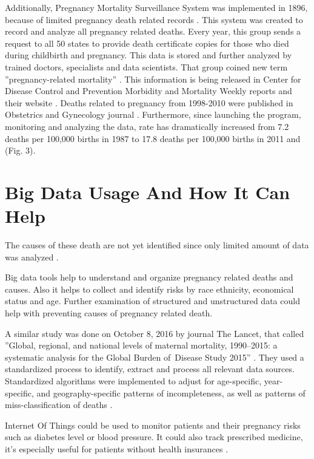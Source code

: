 \documentclass[sigconf]{acmart}
\begin{document}
Additionally, Pregnancy Mortality Surveillance System was implemented in 1896, because of limited pregnancy death related records  \cite{horon2011effectiveness}. This system was created to record and analyze all pregnancy related deaths. Every year, this group sends a request to all 50 states to provide death certificate copies for those who died during childbirth and pregnancy. This data is stored and further analyzed by trained doctors, specialists and data scientists. That group coined new term ''pregnancy-related mortality'' \cite{callaghan2012overview}. This information is being released in Center for Disease Control and Prevention Morbidity and Mortality Weekly reports and their website \cite{neggers2016trends}. Deaths related to pregnancy from 1998-2010 were published in Obstetrics and Gynecology journal \cite{schulz1994assessing}. Furthermore, since launching the program, monitoring and analyzing the data, rate has dramatically increased from 7.2 deaths per 100,000 births in 1987 to 17.8 deaths per 100,000 births in 2011 \cite{neggers2016trends} and (Fig. 3).


\section{Big Data Usage And How It Can Help}

The causes of these death are not yet identified since only limited amount of data was analyzed \cite{creanga2012race}.

Big data tools help to understand and organize pregnancy related deaths and causes. Also it helps to collect and identify risks by race ethnicity, economical status and age. Further examination of structured and unstructured data could help with preventing causes of pregnancy related death.

A similar study was done on October 8, 2016 by  journal The Lancet, that called ''Global, regional, and national levels of maternal mortality, 1990–2015: a systematic analysis for the Global Burden of Disease Study 2015'' \cite{kassebaum2016global}. They used a standardized process to identify, extract and process all relevant data sources. Standardized algorithms were implemented to adjust for age-specific, year-specific, and geography-specific patterns of incompleteness, as well as patterns of miss-classification of deaths \cite{mcginnis2013best}.

Internet Of Things could be used to  monitor patients and their pregnancy risks  such as diabetes level or blood pressure. It could also track prescribed medicine, it’s especially useful for patients without health insurances \cite{kassebaum2016global}. 
\end{document}
